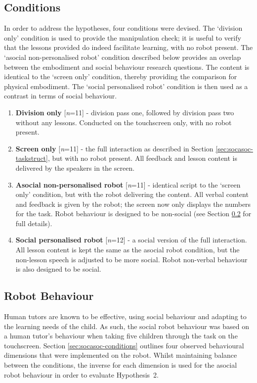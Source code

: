 \subsection{Conditions}\label{sec:socasoc-conds}
In order to address the hypotheses, four conditions were devised. The `division only' condition is used to provide the manipulation check;  it is useful to verify that the lessons provided do indeed facilitate learning, with no robot present. The `asocial non-personalised robot' condition described below provides an overlap between the embodiment and social behaviour research questions. The content is identical to the `screen only' condition, thereby providing the comparison for physical embodiment. The `social personalised robot' condition is then used as a contrast in terms of social behaviour.
\begin{enumerate}
	\item \textbf{Division only} [\textit{n}=11] - division pass one, followed by division pass two without any lessons. Conducted on the touchscreen only, with no robot present.
	\item \textbf{Screen only} [\textit{n}=11] - the full interaction as described in Section \ref{sec:socasoc-taskstruct}, but with no robot present. All feedback and lesson content is delivered by the speakers in the screen.
	\item \textbf{Asocial non-personalised robot} [\textit{n}=11] - identical script to the `screen only' condition, but with the robot delivering the content. All verbal content and feedback is given by the robot; the screen now only displays the numbers for the task. Robot behaviour is designed to be non-social (see Section \ref{sec:socasoc-robbehave} for full details).
	\item \textbf{Social personalised robot} [\textit{n}=12] - a social version of the full interaction. All lesson content is kept the same as the asocial robot condition, but the non-lesson speech is adjusted to be more social. Robot non-verbal behaviour is also designed to be social.
\end{enumerate}

\subsection{Robot Behaviour}\label{sec:socasoc-robbehave}
Human tutors are known to be effective, using social behaviour and adapting to the \gls{learning} needs of the child. As such, the social robot behaviour was based on a human tutor's behaviour when taking five children through the task on the touchscreen. Section \ref{sec:socasoc-conditions} outlines four observed behavioural dimensions that were implemented on the robot. Whilst maintaining balance between the conditions, the inverse for each dimension is used for the asocial robot behaviour in order to evaluate Hypothesis~2.

